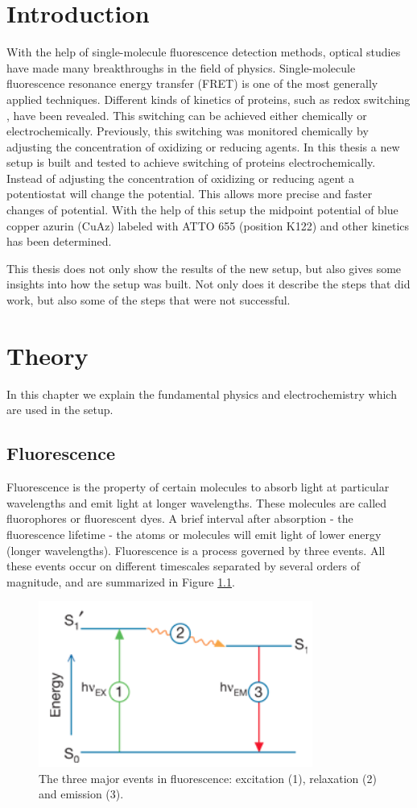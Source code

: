 \documentclass[twoside,single]{lion-msc}
\begin{document}
\chapter*{Introduction}
With the help of single-molecule fluorescence detection methods, optical studies have made many breakthroughs in the field of physics. Single-molecule fluorescence resonance energy transfer (FRET) is one of the most generally applied techniques. Different kinds of kinetics of proteins, such as redox switching \cite{Akklc}, have been revealed. This switching can be achieved either chemically or electrochemically. Previously, this switching was monitored chemically by adjusting the concentration of oxidizing or reducing agents. In this thesis a new setup is built and tested to achieve switching of proteins electrochemically. Instead of adjusting the concentration of oxidizing or reducing agent a potentiostat will change the potential. This allows more precise and faster changes of potential. With the help of this setup the midpoint potential of blue copper azurin (CuAz) labeled with ATTO 655 (position K122) and other kinetics has been determined. 

This thesis does not only show the results of the new setup, but also gives some insights into how the setup was built. Not only does it describe the steps that did work, but also some of the steps that were not successful. 


\chapter{Theory}
In this chapter we explain the fundamental physics and electrochemistry which are used in the setup.

\section{Fluorescence}
Fluorescence is the property of certain molecules to absorb light at particular wavelengths and emit light at longer wavelengths. These molecules are called fluorophores or fluorescent dyes. A brief interval after absorption - the fluorescence lifetime - the atoms or molecules will emit light of lower energy (longer wavelengths).  Fluorescence is a process governed by three events. All these events occur on different timescales separated by several orders of magnitude, and are summarized in Figure \ref{fluor}.
\begin{figure}[ht!]
\centering
\includegraphics[width=90mm]{fluorescence.jpg}
\caption{The three major events in fluorescence: excitation (1), relaxation (2) and emission (3).} 
\label{fluor}
\end{figure}
\end{document}
